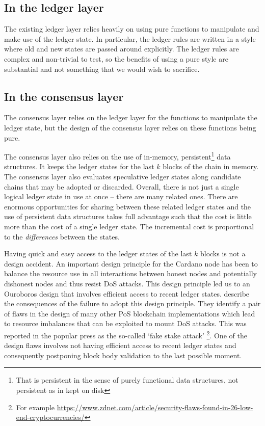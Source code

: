 \documentclass[11pt,a4paper]{article}
\begin{document}
\subsection{In the ledger layer}
\label{ledger-state-handling-in-the-current-ledger-layer}

The existing ledger layer relies heavily on using pure functions to manipulate
and make use of the ledger state. In particular, the ledger rules are written in
a style where old and new states are passed around explicitly. The ledger rules
are complex and non-trivial to test, so the benefits of using a pure style are
substantial and not something that we would wish to sacrifice.

\subsection{In the consensus layer}
\label{ledger-state-handling-in-the-current-consensus-layer}

The consensus layer relies on the ledger layer for the functions to manipulate
the ledger state, but the design of the consensus layer relies on these
functions being pure.

The consensus layer also relies on the use of in-memory,
persistent\footnote{That is persistent in the sense of purely functional data
structures, not persistent as in kept on disk} data structures. It keeps the
ledger states for the last $k$ blocks of the chain in memory. The consensus
layer also evaluates speculative ledger states along candidate chains that may
be adopted or discarded. Overall, there is not just a single logical ledger
state in use at once -- there are many related ones. There are enormous
opportunities for sharing between these related ledger states and the use of
persistent data structures takes full advantage such that the cost is little
more than the cost of a single ledger state. The incremental cost is
proportional to the \emph{differences} between the states.

Having quick and easy access to the ledger states of the last $k$ blocks is not
a design accident. An important design principle for the Cardano node has been
to balance the resource use in all interactions between honest nodes and
potentially dishonest nodes and thus resist DoS attacks. This design principle
led us to an Ouroboros design that involves efficient access to recent ledger
states. \citet{fake-stake} describe the consequences of the failure to adopt
this design principle. They identify a pair of flaws in the design of many
other PoS blockchain implementations which lead to resource imbalances that can
be exploited to mount DoS attacks. This was reported in the popular press as
the so-called `fake stake attack'%
\footnote{For example \url{https://www.zdnet.com/article/security-flaws-found-in-26-low-end-cryptocurrencies/}}.
One of the design flaws involves not having efficient access to recent ledger
states and consequently postponing block body validation to the last possible
moment.
\end{document}
